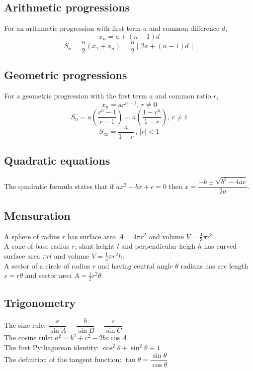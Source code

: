 \documentclass[class=exam, crop=false, 12pt]{standalone}
\begin{document}
\subsection*{Arithmetic progressions}
For an arithmetic progression with first term $a$ and common difference $d$,
\[ x_{n} = a + (n-1)d\]
\[ S_{n} = \frac{n}{2}(x_{1} + x_{n}) = \frac{n}{2}[\,2a+(n-1)d\,] \]

\subsection*{Geometric progressions}
For a geometric progression with the first term $a$ and common ratio $r$,
\[ x_{n} = ar^{n-1},\,r\neq 0\]
\[ S_{n} = a \left( \frac{r^{n} -1}{r-1} \right) = a \left( \frac{1 - r^{n} }{1-r} \right),\,r\neq 1 \]
\[ S_{\infty} = \frac{a}{1-r} \, , \, |r| < 1 \]

\subsection*{Quadratic equations}
The quadratic formula states that if $ax^{2}+bx+c = 0$ then $ x = \dfrac{-b \pm \sqrt{b^{2} - 4ac}}{2a}$.

\subsection*{Mensuration}
A sphere of radius $r$ has surface area $A = 4\pi r^{2}$ and volume $V = \frac{4}{3}\pi r^{3}$.\vspace{0.1in}\\ 
A cone of base radius $r$, slant height $l$ and perpendicular heigh $h$ has curved surface area $\pi rl$ and volume $V = \frac{1}{3}\pi r^{2}h$.\vspace{0.1in}\\
A sector of a circle of radius $r$ and having central angle $\theta$ radians has arc length $s=r\theta$ and sector area $A = \frac{1}{2}r^{2}\theta$.

\subsection*{Trigonometry}
The sine rule: $\dfrac{a}{\sin{A}} = \dfrac{b}{\sin{B}} = \dfrac{c}{\sin{C}}$\vspace{0.1in}\\
The cosine rule: $a^{2} = b^{2} + c^{2} - 2bc\cos{A}$\vspace{0.1in}\\
The first Pythagorean identity: $\cos^{2}{\theta} + \sin^{2}{\theta} \equiv 1$\vspace{0.1in}\\
The definition of the tangent function: $\tan{\theta} = \dfrac{\sin{\theta}}{\cos{\theta}}$
\end{document}
